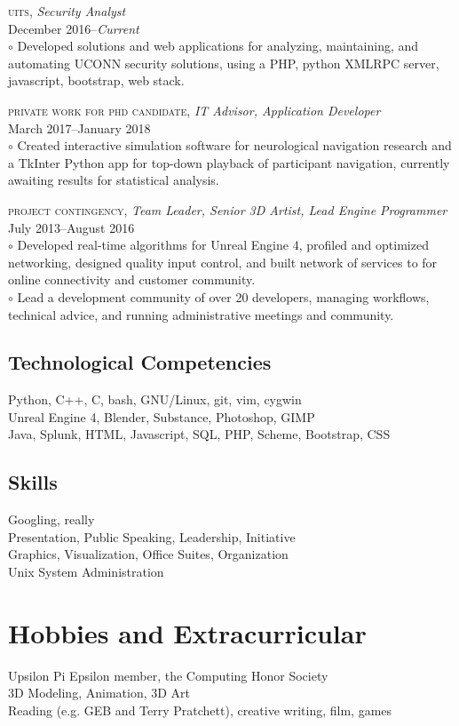 \documentclass[Letterpaper,11pt]{article}
\begin{document}
    \textsc{uits}, 
    \textit{Security Analyst}\\
    December 2016--\textit{Current}\\
        $\circ$ Developed solutions and web applications for analyzing, maintaining, and automating UCONN security solutions, using a PHP, python XMLRPC server, javascript, bootstrap, web stack.

    \textsc{private work for phd candidate}, 
    \textit{IT Advisor, Application Developer}\\
    March 2017--January 2018\\
        $\circ$ Created interactive simulation software for neurological navigation research and a TkInter Python app for top-down playback of participant navigation, currently awaiting results for statistical analysis.
        
    \textsc{project contingency}, 
    \textit{Team Leader, Senior 3D Artist, Lead Engine Programmer}\\
    July 2013--August 2016\\
        $\circ$ Developed real-time algorithms for Unreal Engine 4, profiled and optimized networking, designed quality input control, and built network of services to for online connectivity and customer community.
        \\
        $\circ$ Lead a development community of over 20 developers, managing workflows, technical advice, and running administrative meetings and community.
        
\begin{multicols}{2}

    \subsection*{Technological Competencies}
    
        Python, C++, C, bash, GNU/Linux, git, vim, cygwin
        \\
        Unreal Engine 4, Blender, Substance, Photoshop, GIMP
        \\
        Java, Splunk, HTML, Javascript, SQL, PHP, Scheme, Bootstrap, CSS 
    
    \subsection*{Skills}
    
        Googling, really\\
        Presentation, Public Speaking, Leadership, Initiative\\
        Graphics, Visualization, Office Suites, Organization\\
        Unix System Administration\\
    
\end{multicols}

\section*{Hobbies and Extracurricular}

    Upsilon Pi Epsilon member, the Computing Honor Society\\
    3D Modeling, Animation, 3D Art\\
    Reading (e.g. GEB and Terry Pratchett), creative writing, film, games
    
\clearpage
\end{document}

